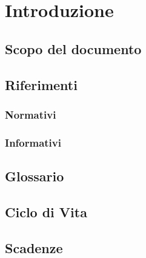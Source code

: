 \section{Introduzione}
\subsection{Scopo del documento}
\subsection{Riferimenti}
\subsubsection{Normativi}
\subsubsection{Informativi}
\subsection{Glossario}
\subsection{Ciclo di Vita}
\subsection{Scadenze}